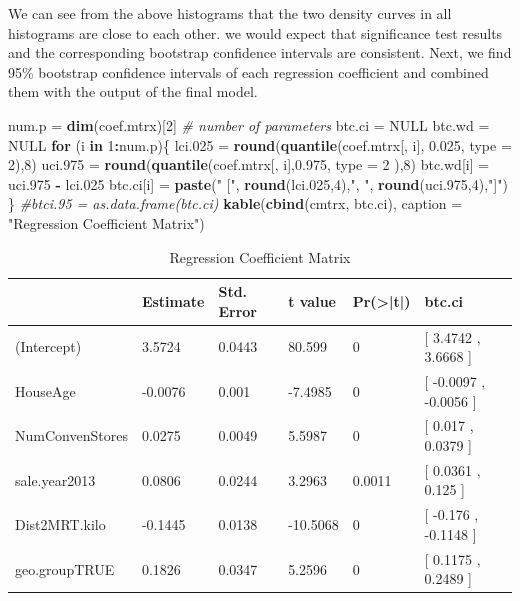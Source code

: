 \documentclass[
]{book}
\newenvironment{Shaded}{\begin{snugshade}}{\end{snugshade}}
\newcommand{\AttributeTok}[1]{\textcolor[rgb]{0.13,0.29,0.53}{#1}}
\newcommand{\CommentTok}[1]{\textcolor[rgb]{0.56,0.35,0.01}{\textit{#1}}}
\newcommand{\ConstantTok}[1]{\textcolor[rgb]{0.56,0.35,0.01}{#1}}
\newcommand{\ControlFlowTok}[1]{\textcolor[rgb]{0.13,0.29,0.53}{\textbf{#1}}}
\newcommand{\DecValTok}[1]{\textcolor[rgb]{0.00,0.00,0.81}{#1}}
\newcommand{\FloatTok}[1]{\textcolor[rgb]{0.00,0.00,0.81}{#1}}
\newcommand{\FunctionTok}[1]{\textcolor[rgb]{0.13,0.29,0.53}{\textbf{#1}}}
\newcommand{\NormalTok}[1]{#1}
\newcommand{\OtherTok}[1]{\textcolor[rgb]{0.56,0.35,0.01}{#1}}
\newcommand{\SpecialCharTok}[1]{\textcolor[rgb]{0.81,0.36,0.00}{\textbf{#1}}}
\newcommand{\StringTok}[1]{\textcolor[rgb]{0.31,0.60,0.02}{#1}}
\begin{document}
We can see from the above histograms that the two density curves in all histograms are close to each other. we would expect that significance test results and the corresponding bootstrap confidence intervals are consistent. Next, we find 95\% bootstrap confidence intervals of each regression coefficient and combined them with the output of the final model.

\begin{Shaded}
\begin{Highlighting}[]
\NormalTok{num.p }\OtherTok{=} \FunctionTok{dim}\NormalTok{(coef.mtrx)[}\DecValTok{2}\NormalTok{]  }\CommentTok{\# number of parameters}
\NormalTok{btc.ci }\OtherTok{=} \ConstantTok{NULL}
\NormalTok{btc.wd }\OtherTok{=} \ConstantTok{NULL}
\ControlFlowTok{for}\NormalTok{ (i }\ControlFlowTok{in} \DecValTok{1}\SpecialCharTok{:}\NormalTok{num.p)\{}
\NormalTok{  lci}\FloatTok{.025} \OtherTok{=} \FunctionTok{round}\NormalTok{(}\FunctionTok{quantile}\NormalTok{(coef.mtrx[, i], }\FloatTok{0.025}\NormalTok{, }\AttributeTok{type =} \DecValTok{2}\NormalTok{),}\DecValTok{8}\NormalTok{)}
\NormalTok{  uci}\FloatTok{.975} \OtherTok{=} \FunctionTok{round}\NormalTok{(}\FunctionTok{quantile}\NormalTok{(coef.mtrx[, i],}\FloatTok{0.975}\NormalTok{, }\AttributeTok{type =} \DecValTok{2}\NormalTok{ ),}\DecValTok{8}\NormalTok{)}
\NormalTok{  btc.wd[i] }\OtherTok{=}\NormalTok{  uci}\FloatTok{.975} \SpecialCharTok{{-}}\NormalTok{ lci}\FloatTok{.025}
\NormalTok{  btc.ci[i] }\OtherTok{=} \FunctionTok{paste}\NormalTok{(}\StringTok{"     ["}\NormalTok{, }\FunctionTok{round}\NormalTok{(lci}\FloatTok{.025}\NormalTok{,}\DecValTok{4}\NormalTok{),}\StringTok{", "}\NormalTok{, }\FunctionTok{round}\NormalTok{(uci}\FloatTok{.975}\NormalTok{,}\DecValTok{4}\NormalTok{),}\StringTok{"]"}\NormalTok{)}
\NormalTok{ \}}
\CommentTok{\#btci.95 = as.data.frame(btc.ci)}
\FunctionTok{kable}\NormalTok{(}\FunctionTok{cbind}\NormalTok{(cmtrx, btc.ci), }
      \AttributeTok{caption =} \StringTok{"Regression Coefficient Matrix"}\NormalTok{)}
\end{Highlighting}
\end{Shaded}

\begin{table}

\caption{\label{tab:unnamed-chunk-105}Regression Coefficient Matrix}
\centering
\begin{tabular}[t]{l|l|l|l|l|l}
\hline
  & Estimate & Std. Error & t value & Pr(>|t|) & btc.ci\\
\hline
(Intercept) & 3.5724 & 0.0443 & 80.599 & 0 & [ 3.4742 ,  3.6668 ]\\
\hline
HouseAge & -0.0076 & 0.001 & -7.4985 & 0 & [ -0.0097 ,  -0.0056 ]\\
\hline
NumConvenStores & 0.0275 & 0.0049 & 5.5987 & 0 & [ 0.017 ,  0.0379 ]\\
\hline
sale.year2013 & 0.0806 & 0.0244 & 3.2963 & 0.0011 & [ 0.0361 ,  0.125 ]\\
\hline
Dist2MRT.kilo & -0.1445 & 0.0138 & -10.5068 & 0 & [ -0.176 ,  -0.1148 ]\\
\hline
geo.groupTRUE & 0.1826 & 0.0347 & 5.2596 & 0 & [ 0.1175 ,  0.2489 ]\\
\hline
\end{tabular}
\end{table}
\end{document}
